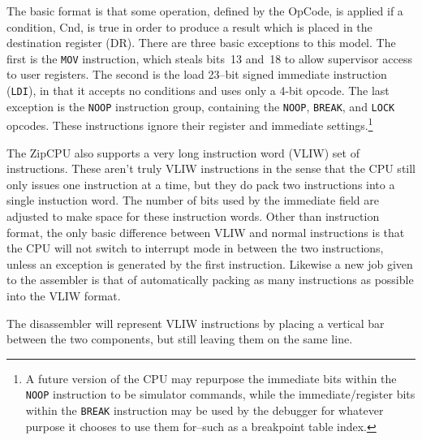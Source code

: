 \documentclass{gqtekspec}
\begin{document}
The basic format is that some operation, defined by the OpCode, is applied
if a condition, Cnd, is true in order to produce a result which is placed in
the destination register (DR).  There are three basic exceptions to this
model.  The first is the {\tt MOV} instruction, which steals bits~13 and~18
to allow supervisor access to user registers.  The second is the load 23--bit
signed immediate instruction ({\tt LDI}), in that it accepts no conditions and
uses only a 4-bit opcode.  The last exception is the {\tt NOOP} instruction
group, containing the {\tt NOOP}, {\tt BREAK}, and {\tt LOCK} opcodes.  These
instructions ignore their register and immediate settings.\footnote{A future
version of the CPU may repurpose the immediate bits within the {\tt NOOP}
instruction to be simulator commands, while the immediate/register bits within
the {\tt BREAK} instruction may be used by the debugger for whatever purpose
it chooses to use them for--such as a breakpoint table index.}

The ZipCPU also supports a very long instruction word (VLIW) set of
instructions.  These aren't truly VLIW instructions in the sense that the CPU
still only issues one instruction at a time, but they do pack two instructions
into a single instuction word.  The number of bits used by the immediate field
are adjusted to make space for these instruction words.  Other than instruction
format, the only basic difference between VLIW and normal instructions is that
the CPU will not switch to interrupt mode in between the two instructions,
unless an exception is generated by the first instruction.  Likewise a new job
given to the assembler is that of automatically packing as many instructions as
possible into the VLIW format.

The disassembler will represent VLIW instructions by placing a vertical bar
between the two components, but still leaving them on the same line.
\end{document}
